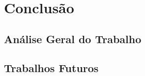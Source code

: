 \chapter{\textbf{Conclusão}} %

\section{Análise Geral do Trabalho}


\section{Trabalhos Futuros}


